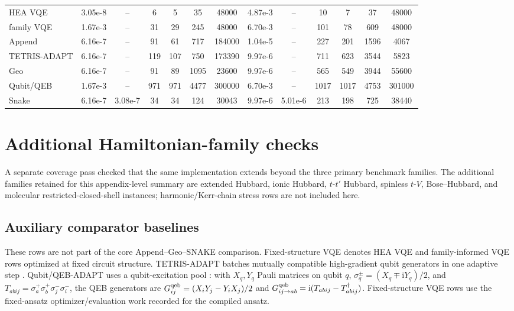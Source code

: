 \documentclass[
  reprint,
  amsmath,
  amssymb,
  aps,
  pra,
  nofootinbib,
  superscriptaddress,
  floatfix
]{revtex4-2}
\newcommand{\ii}{\mathrm{i}}
\begin{document}
\begin{widetext}
\begin{minipage}{\textwidth}
\begin{center}
\begin{ruledtabular}
\begin{tabular}{p{}cccccc|cccccc}
\colrule
HEA VQE & 3.05e-8 & -- & 6 & 5 & 35 & 48000 & 4.87e-3 & -- & 10 & 7 & 37 & 48000\\
family VQE & 1.67e-3 & -- & 31 & 29 & 245 & 48000 & 6.70e-3 & -- & 101 & 78 & 609 & 48000\\
Append & 6.16e-7 & -- & 91 & 61 & 717 & 184000 & 1.04e-5 & -- & 227 & 201 & 1596 & 4067\\
TETRIS-ADAPT & 6.16e-7 & -- & 119 & 107 & 750 & 173390 & 9.97e-6 & -- & 711 & 623 & 3544 & 5823\\
Geo & 6.16e-7 & -- & 91 & 89 & 1095 & 23600 & 9.97e-6 & -- & 565 & 549 & 3944 & 55600\\
Qubit/QEB & 1.67e-3 & -- & 971 & 971 & 4477 & 300000 & 6.70e-3 & -- & 1017 & 1017 & 4753 & 301000\\
Snake & 6.16e-7 & 3.08e-7 & 34 & 34 & 124 & 30043 & 9.97e-6 & 5.01e-6 & 213 & 198 & 725 & 38440\\
\end{tabular}
\end{ruledtabular}
\end{center}
\end{minipage}
\par\addvspace{1.0ex}
\par\addvspace{1.0ex}
\end{widetext}
\fi
\section{Additional Hamiltonian-family checks}
\label{app:additional_hamiltonian_checks}

A separate coverage pass checked that the same implementation extends beyond the three primary benchmark families.  The additional families retained for this appendix-level summary are extended Hubbard, ionic Hubbard, \(t\)-\(t'\) Hubbard, spinless \(t\)-\(V\), Bose--Hubbard, and molecular restricted-closed-shell instances; harmonic/Kerr-chain stress rows are not included here.

\subsection{Auxiliary comparator baselines}
\label{app:auxiliary_comparator_baselines}

These rows are not part of the core Append--Geo--SNAKE comparison.  Fixed-structure VQE denotes HEA VQE and family-informed VQE rows optimized at fixed circuit structure.  TETRIS-ADAPT batches mutually compatible high-gradient qubit generators in one adaptive step \cite{Anastasiou2024}.  Qubit/QEB-ADAPT uses a qubit-excitation pool \cite{Tang2021,Yordanov2021}: with \(X_q,Y_q\) Pauli matrices on qubit \(q\), \(\sigma_q^\pm=(X_q\mp\ii Y_q)/2\), and \(T_{abij}=\sigma_a^+\sigma_b^+\sigma_j^-\sigma_i^-\), the QEB generators are \(G_{ij}^{\rm qeb}=(X_iY_j-Y_iX_j)/2\) and \(G_{ij\to ab}^{\rm qeb}=\ii(T_{abij}-T_{abij}^{\dagger})\). Fixed-structure VQE rows use the fixed-ansatz optimizer/evaluation work recorded for the compiled ansatz.
\end{document}
